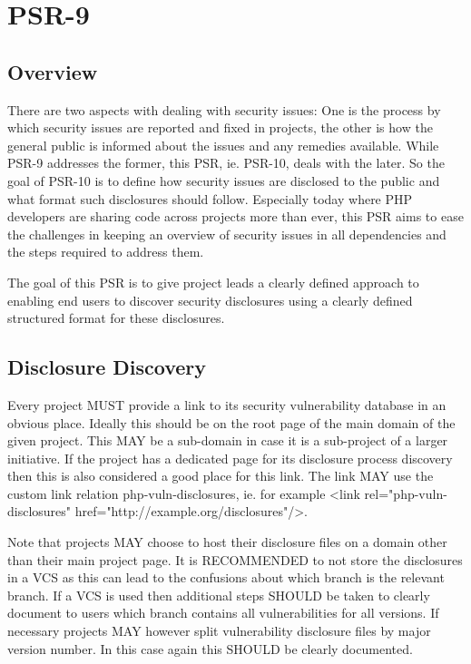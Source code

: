 \chapter{PSR-9}

\section{Overview}


There are two aspects with dealing with security issues: One is the process by which security issues are reported and fixed in projects, the other is how the general public is informed about the issues and any remedies available. While PSR-9 addresses the former, this PSR, ie. PSR-10, deals with the later. So the goal of PSR-10 is to define how security issues are disclosed to the public and what format such disclosures should follow. Especially today where PHP developers are sharing code across projects more than ever, this PSR aims to ease the challenges in keeping an overview of security issues in all dependencies and the steps required to address them.

The goal of this PSR is to give project leads a clearly defined approach to enabling end users to discover security disclosures using a clearly defined structured format for these disclosures.

\section{Disclosure Discovery}

Every project MUST provide a link to its security vulnerability database in an obvious place. Ideally this should be on the root page of the main domain of the given project. This MAY be a sub-domain in case it is a sub-project of a larger initiative. If the project has a dedicated page for its disclosure process discovery then this is also considered a good place for this link. The link MAY use the custom link relation php-vuln-disclosures, ie. for example <link rel="php-vuln-disclosures" href="http://example.org/disclosures"/>.

Note that projects MAY choose to host their disclosure files on a domain other than their main project page. It is RECOMMENDED to not store the disclosures in a VCS as this can lead to the confusions about which branch is the relevant branch. If a VCS is used then additional steps SHOULD be taken to clearly document to users which branch contains all vulnerabilities for all versions. If necessary projects MAY however split vulnerability disclosure files by major version number. In this case again this SHOULD be clearly documented.


